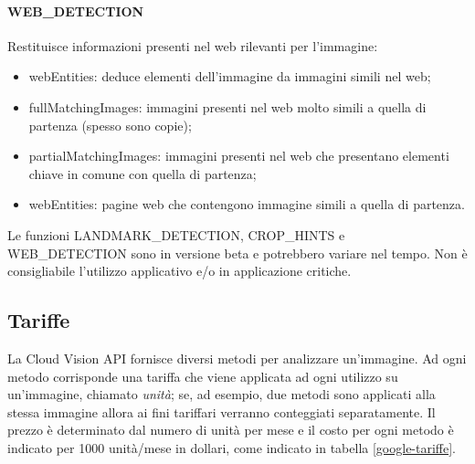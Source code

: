 \paragraph{\textsf{WEB\_DETECTION}} Restituisce informazioni presenti nel web rilevanti per l'immagine:
\begin{itemize}
\item \textsf{webEntities}: deduce elementi dell'immagine da immagini simili nel web;
\item \textsf{fullMatchingImages}: immagini presenti nel web molto simili a quella di partenza (spesso sono copie);
\item \textsf{partialMatchingImages}: immagini presenti nel web che presentano elementi chiave in comune con quella di partenza;
\item \textsf{webEntities}: pagine web che contengono immagine simili a quella di partenza.
\end{itemize}

%

Le funzioni \textsf{LANDMARK\_DETECTION}, \textsf{CROP\_HINTS} e \textsf{WEB\_DETECTION} sono in versione beta e potrebbero variare nel tempo.
Non è consigliabile l'utilizzo applicativo e/o in applicazione critiche.
%
%
%
\subsection{Tariffe}
La Cloud Vision API fornisce diversi metodi per analizzare un'immagine.
Ad ogni metodo corrisponde una tariffa che viene applicata ad ogni utilizzo su un'immagine, chiamato \textit{unità};
se, ad esempio, due metodi sono applicati alla stessa immagine allora ai fini tariffari verranno conteggiati separatamente.
Il prezzo è determinato dal numero di unità per mese e il costo per ogni metodo è indicato per 1000 unità/mese in dollari, come indicato in tabella \ref{google-tariffe}.

